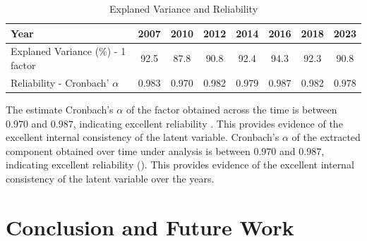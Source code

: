 \documentclass[a4paper,11pt,twoside]{article}
\begin{document}
\begin{table}[h]
  \caption{Explaned Variance and Reliability}
  \label{tab:loadings}
  \centering
\begin{tabular}{lccccccc}
\hline
Year &	\textbf{2007}	&	\textbf{2010}	&	\textbf{2012}	&	\textbf{2014}	&	\textbf{2016}	&	\textbf{2018}	&	\textbf{2023}	\\  
\hline
Explaned Variance (\%) - 1 factor 	&	92.5	&	87.8	&	90.8	&	92.4	&	94.3	&	92.3	&	90.8	\\	\hline
Reliability - Cronbach' $\alpha$	&	0.983	&	0.970	&	0.982	&	0.979	&	0.987	&	0.982	&	0.978	\\	\hline
\end{tabular}
\end{table}

The estimate Cronbach's $\alpha$ of the factor obtained across the time is between $0.970$ and $0.987$, indicating excellent reliability . This provides evidence of the excellent internal consistency of the latent variable.
%
Cronbach's $\alpha$ of the extracted component obtained over time under analysis is between $0.970$ and $0.987$, indicating excellent reliability (\cite{pestana2008analise}). This provides evidence of the excellent internal consistency of the latent variable over the years.

\section{Conclusion and Future Work}
\end{document}
